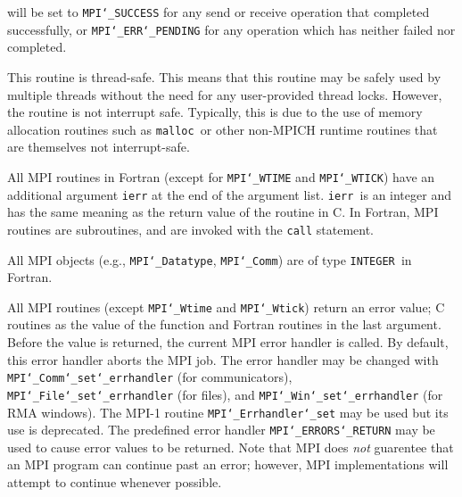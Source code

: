will be set to {\tt MPI{\tt \char`\_}SUCCESS} for any send or receive operation that completed
successfully, or {\tt MPI{\tt \char`\_}ERR{\tt \char`\_}PENDING} for any operation which has neither
failed nor completed.
\par
{}
\par
This routine is thread-safe.  This means that this routine may be
safely used by multiple threads without the need for any user-provided
thread locks.  However, the routine is not interrupt safe.  Typically,
this is due to the use of memory allocation routines such as {\tt malloc
}or other non-MPICH runtime routines that are themselves not interrupt-safe.
\par
{}
All MPI routines in Fortran (except for {\tt MPI{\tt \char`\_}WTIME} and {\tt MPI{\tt \char`\_}WTICK}) have
an additional argument {\tt ierr} at the end of the argument list.  {\tt ierr
}is an integer and has the same meaning as the return value of the routine
in C.  In Fortran, MPI routines are subroutines, and are invoked with the
{\tt call} statement.
\par
All MPI objects (e.g., {\tt MPI{\tt \char`\_}Datatype}, {\tt MPI{\tt \char`\_}Comm}) are of type {\tt INTEGER
}in Fortran.
\par
{}
\par
All MPI routines (except {\tt MPI{\tt \char`\_}Wtime} and {\tt MPI{\tt \char`\_}Wtick}) return an error value;
C routines as the value of the function and Fortran routines in the last
argument.  Before the value is returned, the current MPI error handler is
called.  By default, this error handler aborts the MPI job.  The error handler
may be changed with {\tt MPI{\tt \char`\_}Comm{\tt \char`\_}set{\tt \char`\_}errhandler} (for communicators),
{\tt MPI{\tt \char`\_}File{\tt \char`\_}set{\tt \char`\_}errhandler} (for files), and {\tt MPI{\tt \char`\_}Win{\tt \char`\_}set{\tt \char`\_}errhandler} (for
RMA windows).  The MPI-1 routine {\tt MPI{\tt \char`\_}Errhandler{\tt \char`\_}set} may be used but
its use is deprecated.  The predefined error handler
{\tt MPI{\tt \char`\_}ERRORS{\tt \char`\_}RETURN} may be used to cause error values to be returned.
Note that MPI does {\em not} guarentee that an MPI program can continue past
an error; however, MPI implementations will attempt to continue whenever
possible.
\par
{}
\endmanpage
